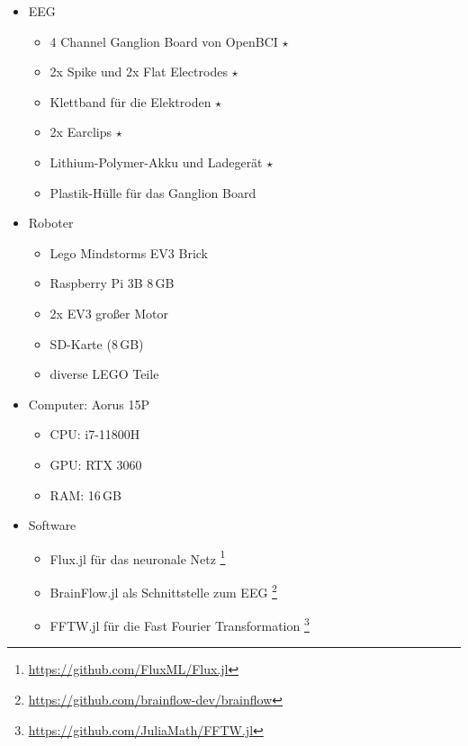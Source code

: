 \documentclass{scrartcl}
\begin{document}
	\begin{itemize}
		\item EEG
		\begin{itemize}
			\item 4 Channel Ganglion Board von OpenBCI $\star$
			\item 2x Spike und 2x Flat Electrodes  $\star$
			\item Klettband für die Elektroden $\star$
			\item 2x Earclips $\star$
			\item Lithium-Polymer-Akku und Ladegerät $\star$
			\item Plastik-Hülle für das Ganglion Board
		\end{itemize}

		\item Roboter
		\begin{itemize}
			\item Lego Mindstorms EV3 Brick
			\item Raspberry Pi 3B 8\,GB
			\item 2x EV3 großer Motor
			\item SD-Karte (8\,GB)
			\item diverse LEGO Teile
		\end{itemize}

		\item Computer: Aorus 15P
		\begin{itemize}
			\item CPU: i7-11800H
			\item GPU: RTX 3060
			\item RAM: 16\,GB
		\end{itemize}
		\item Software
		\begin{itemize}
			\item Flux.jl für das neuronale Netz
				\footnote{\href{https://github.com/FluxML/Flux.jl}{https://github.com/FluxML/Flux.jl}}
				\cite{Flux.jl-2018}
				\cite{innes:2018}
			
			\item BrainFlow.jl als Schnittstelle zum EEG
				\footnote{\href{https://github.com/brainflow-dev/brainflow}{https://github.com/brainflow-dev/brainflow}}
				\cite{brainflow}
			
			\item FFTW.jl für die Fast Fourier Transformation
				\footnote{\href{https://github.com/JuliaMath/FFTW.jl}{https://github.com/JuliaMath/FFTW.jl}}
				\cite{FFTW.jl-2005}
			

\end{itemize}
\end{itemize}
\end{document}
